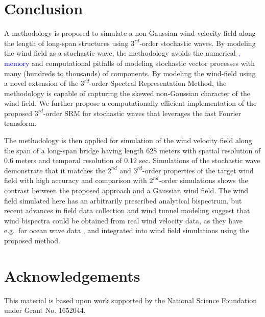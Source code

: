 \documentclass[preprint, review, 12pt]{elsarticle}
\begin{document}
\section{Conclusion}

A methodology is proposed to simulate a non-Gaussian wind velocity field along the length of long-span structures using $3^{rd}$-order stochastic waves. By modeling the wind field as a stochastic wave, the methodology avoids the numerical \textcolor{blue}{, memory} and computational pitfalls of modeling stochastic vector processes with many (hundreds to thousands) of components. By modeling the wind-field using a novel extension of the $3^{rd}$-order Spectral Representation Method, the methodology is capable of capturing the skewed non-Gaussian character of the wind field. We further propose a computationally efficient implementation of the proposed $3^{rd}$-order SRM for stochastic waves that leverages the fast Fourier transform.

The methodology is then applied for simulation of the wind velocity field along the span of a long-span bridge having length 628 meters with spatial resolution of 0.6 meters and temporal resolution of 0.12 sec. Simulations of the stochastic wave demonstrate that it matches the $2^{nd}$ and $3^{rd}$-order properties of the target wind field with high accuracy and comparison with $2^{nd}$-order simulations shows the contrast between the proposed approach and a Gaussian wind field. The wind field simulated here has an arbitrarily prescribed analytical bispectrum, but recent advances in field data collection and wind tunnel modeling \cite{catarelli2020automation} suggest that wind bispectra could be obtained from real wind velocity data, as they have e.g.\ for ocean wave data \cite{elgar1985observations}, and integrated into wind field simulations using the proposed method. 

\section{Acknowledgements}

This material is based upon work supported by the National Science Foundation under Grant No. 1652044.



\end{document}
